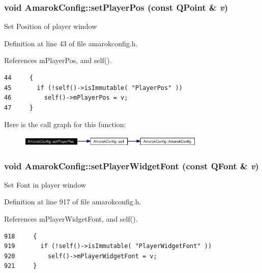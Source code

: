 \subsubsection{\setlength{\rightskip}{0pt plus 5cm}void Amarok\-Config::set\-Player\-Pos (const QPoint \& {\em v})\hspace{0.3cm}{\tt  [inline, static]}}\label{classAmarokConfig_AmarokConfige3}


Set Position of player window 

Definition at line 43 of file amarokconfig.h.

References m\-Player\-Pos, and self().



\footnotesize\begin{verbatim}44     {
45       if (!self()->isImmutable( "PlayerPos" ))
46         self()->mPlayerPos = v;
47     }
\end{verbatim}\normalsize 


Here is the call graph for this function:\begin{figure}[H]
\begin{center}
\leavevmode
\includegraphics[width=253pt]{classAmarokConfig_AmarokConfige3_cgraph}
\end{center}
\end{figure}
\subsubsection{\setlength{\rightskip}{0pt plus 5cm}void Amarok\-Config::set\-Player\-Widget\-Font (const QFont \& {\em v})\hspace{0.3cm}{\tt  [inline, static]}}\label{classAmarokConfig_AmarokConfige95}


Set Font in player window 

Definition at line 917 of file amarokconfig.h.

References m\-Player\-Widget\-Font, and self().



\footnotesize\begin{verbatim}918     {
919       if (!self()->isImmutable( "PlayerWidgetFont" ))
920         self()->mPlayerWidgetFont = v;
921     }
\end{verbatim}\normalsize 


